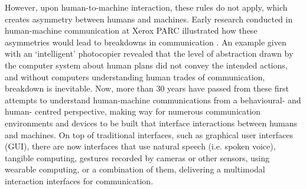 However, upon human-to-machine interaction, these rules do not apply, which creates asymmetry between humans and machines. Early research conducted in human-machine communication at Xerox PARC illustrated how these asymmetries would lead to breakdowns in communication \citep{suchman_plans_1985}. An example given with an `intelligent' photocopier revealed that the level of abstraction drawn by the computer system about human plans did not convey the intended actions, and without computers understanding human trades of communication, breakdown is inevitable. Now, more than 30 years have passed from these first attempts to understand human-machine communications from a behavioural- and human- centred perspective, making way for numerous communication environments and devices to be built that interface interactions between humans and machines. On top of traditional interfaces, such as graphical user interfaces (GUI), there are now interfaces that use natural speech (i.e. spoken voice), tangible computing, gestures recorded by cameras or other sensors, using wearable computing, or a combination of them, delivering a multimodal interaction interfaces for communication.

